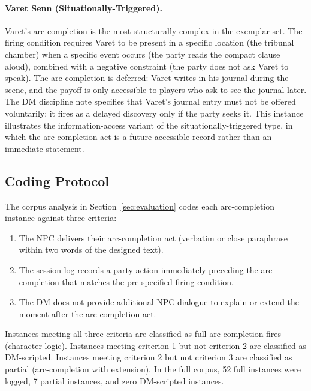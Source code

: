 \paragraph{Varet Senn (Situationally-Triggered).}
Varet's arc-completion is the most structurally complex in the exemplar set.
The firing condition requires Varet to be present in a specific location
(the tribunal chamber) when a specific event occurs (the party reads the
compact clause aloud), combined with a negative constraint (the party does
not ask Varet to speak). The arc-completion is deferred: Varet writes in
his journal during the scene, and the payoff is only accessible to players
who ask to see the journal later. The DM discipline note specifies that Varet's
journal entry must not be offered voluntarily; it fires as a delayed discovery
only if the party seeks it. This instance illustrates the information-access
variant of the situationally-triggered type, in which the arc-completion act
is a future-accessible record rather than an immediate statement.

\subsection{Coding Protocol}

The corpus analysis in Section~\ref{sec:evaluation} codes each arc-completion
instance against three criteria:

\begin{enumerate}
  \item The NPC delivers their arc-completion act (verbatim or close
    paraphrase within two words of the designed text).
  \item The session log records a party action immediately preceding the
    arc-completion that matches the pre-specified firing condition.
  \item The DM does not provide additional NPC dialogue to explain or
    extend the moment after the arc-completion act.
\end{enumerate}

Instances meeting all three criteria are classified as full arc-completion
fires (character logic). Instances meeting criterion 1 but not criterion 2
are classified as DM-scripted. Instances meeting criterion 2 but not
criterion 3 are classified as partial (arc-completion with extension). In the
full corpus, 52 full instances were logged, 7 partial instances, and zero
DM-scripted instances.
